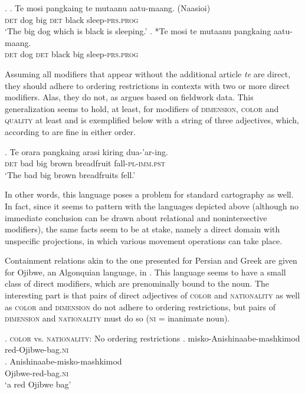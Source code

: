 \documentclass [output=book,colorlinks,citecolor=brown]{langscibook}
\begin{document}
\ex. \ag. Te mosi pangkaing te mutaanu aatu-maang. (Naasioi)\\
\textsc{det} dog big \textsc{det} black sleep-\textsc{prs.prog}\\
`The big dog which is black is sleeping.’
\bg. *Te mosi te mutaanu pangkaing aatu-maang.\\
\textsc{det} dog \textsc{det} black big sleep-\textsc{prs.prog}\\ \null \hfill \citep[432]{brown:2024:adj}

Assuming all modifiers that appear without the additional article \textit{te} are direct, they should adhere to ordering restrictions in contexts with two or more direct modifiers. Alas, they do not, as \citet{brown:2024:adj} argues based on fieldwork data. This generalization seems to hold, at least, for modifiers of \textsc{dimension}, \textsc{color} and \textsc{quality} at least and is exemplified below with a string of three adjectives, which, according to \citet{brown:2024:adj} are fine in either order.

\exg. Te orara pangkaing arasi kiring dua-’ar-ing.\\
\textsc{det} bad big brown breadfruit fall-\textsc{pl-imm.pst}\\
`The bad big brown breadfruits fell.’

In other words, this language poses a problem for standard cartography as well. In fact, since it seems to pattern with the languages depicted above (although no immediate conclusion can be drawn about relational and nonintersective modifiers), the same facts seem to be at stake, namely a direct domain with unspecific projections, in which various movement operations can take place.

Containment relations akin to the one presented for Persian and Greek are given for Ojibwe, an Algonquian language, in \citet{rosen:2016:on}. This language seems to have a small class of direct modifiers, which are prenominally bound to the noun. The interesting part is that pairs of direct adjectives of \textsc{color} and \textsc{nationality} as well as \textsc{color} and \textsc{dimension} do not adhere to ordering restrictions, but pairs of \textsc{dimension} and \textsc{nationality} must do so (\textsc{ni} = inanimate noun).

\ex. \textsc{color} vs. \textsc{nationality}: No ordering restrictions
\ag. misko-Anishinaabe-mashkimod\\
red-Ojibwe-bag.\textsc{ni}\\
\bg. Anishinaabe-misko-mashkimod\\
Ojibwe-red-bag.\textsc{ni}\\
`a red Ojibwe bag’ \null \hfill \citep[161]{rosen:2016:on}
\end{document}
